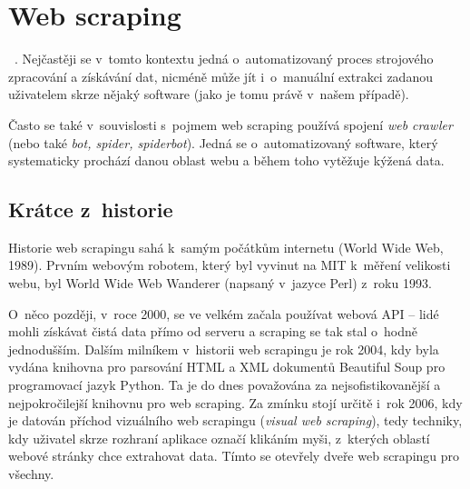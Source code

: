 \documentclass[thesis=B,czech]{FITthesis}[2012/06/26]
\begin{document}

\section{Web scraping}
~\cite[překlad autora]{web_scraping_def}. Nejčastěji se v~tomto kontextu jedná o~automatizovaný proces strojového zpracování a získávání dat, nicméně může jít i~o~manuální extrakci zadanou uživatelem skrze nějaký software (jako je tomu právě v~našem případě).

Často se také v~souvislosti s~pojmem web scraping používá spojení \emph{web crawler} (nebo také \emph{bot, spider, spiderbot}). Jedná se o~automatizovaný software, který systematicky prochází danou oblast webu a během toho vytěžuje kýžená data.~\cite{web_crawler_def}

\subsection{Krátce z~historie}
Historie web scrapingu sahá k~samým počátkům internetu (World Wide Web, 1989). Prvním webovým robotem, který byl vyvinut na MIT k~měření velikosti webu, byl World Wide Web Wanderer (napsaný v~jazyce Perl) z~roku 1993.~\cite{web_wanderer}

O~něco později, v~roce 2000, se ve velkém začala používat webová API -- lidé mohli získávat čistá data přímo od serveru a scraping se tak stal o~hodně jednodušším. Dalším milníkem v~historii web scrapingu je rok 2004, kdy byla vydána knihovna pro parsování HTML a XML dokumentů Beautiful Soup pro programovací jazyk Python. Ta je do dnes považována za nejsofistikovanější a nejpokročilejší knihovnu pro web scraping. Za zmínku stojí určitě i~rok 2006, kdy je datován příchod vizuálního web scrapingu (\label{def:visual_web_scraping}\emph{visual web scraping}), tedy techniky, kdy uživatel skrze rozhraní aplikace označí klikáním myši, z~kterých oblastí webové stránky chce extrahovat data. Tímto se otevřely dveře web scrapingu pro všechny.~\cite{web_scraping_history}
\end{document}
